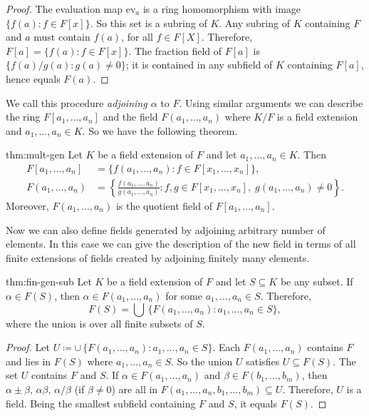 \begin{proof}
  The evaluation map $\mathrm{ev}_a$ is a ring homomorphism with image $\{f(a):f\in F[x]\}$.  
  So this set is a subring of $K$. 
  Any subring of $K$ containing $F$ and $a$ must contain $f(a)$, for all $f\in F[X]$. 
  Therefore, $F[a]=\{f(a):f\in F[x]\}$. 
  The fraction field of $F[a]$ is $\{f(a)/g(a)\colon g(a)\neq 0\}$; it is contained in any subfield of $K$ containing $F[a]$, hence equals $F(a)$.
\end{proof}

We call this procedure \emph{adjoining $\alpha$} to $F$. 
Using similar arguments we can describe the ring $F[a_1,\dots, a_n]$ and the field $F(a_1,\dots, a_n)$ where $K/F$ is a field extension and $a_1,\dots, a_n\in K$. 
So we have the following theorem.
\begin{Theorem}{}{thm:mult-gen}
  Let $K$ be a field extension of $F$ and let $a_1,\ldots,a_n\in K$. Then
  \begin{align*}
    F[a_1,\ldots,a_n] &= \{f(a_1,\ldots,a_n) : f\in F[x_1,\ldots,x_n]\}, \\
    F(a_1,\ldots,a_n) &= \left\{\frac{f(a_1,\ldots,a_n)}{g(a_1,\ldots,a_n)} : f,g\in F[x_1,\ldots,x_n],\; g(a_1,\ldots,a_n)\neq 0\right\}.
  \end{align*}
  Moreover, $F(a_1,\ldots,a_n)$ is the quotient field of $F[a_1,\ldots,a_n]$.
\end{Theorem}

Now we can also define fields generated by adjoining arbitrary number of elements. 
In this case we can give the description of the new field in terms of all finite extensions of fields created by adjoining finitely many elements. 

\begin{Theorem}{}{thm:fin-gen-sub}
  Let $K$ be a field extension of $F$ and let $S\subseteq K$ be any subset. 
  If $\alpha\in F(S)$, then $\alpha\in F(a_1,\ldots,a_n)$ for some $a_1,\ldots,a_n\in S$. 
  Therefore,
  \[
    F(S) = \bigcup\,\{F(a_1,\ldots,a_n) \colon a_1,\ldots,a_n\in S\},
  \]
  where the union is over all finite subsets of $S$.
\end{Theorem}

\begin{proof}
  Let $U\coloneqq \cup\,\{F(a_1,\ldots,a_n) \colon a_1,\ldots,a_n\in S\}$. 
  Each $F(a_1,\ldots,a_n)$ contains $F$ and lies in $F(S)$ where $a_1,\dots, a_n\in S$. 
  So the union $U$ satisfies $U\subseteq F(S)$. 
  The set $U$ contains $F$ and $S$. 
  If $\alpha\in F(a_1,\ldots,a_n)$ and $\beta\in F(b_1,\ldots,b_m)$, then $\alpha\pm\beta,\,\alpha\beta,\,\alpha/\beta$ (if $\beta\neq 0$) are all in $F(a_1,\ldots,a_n,b_1,\ldots,b_m)\subseteq U$. 
  Therefore, $U$ is a field. Being the smallest subfield containing $F$ and $S$, it equals $F(S)$.
\end{proof}


